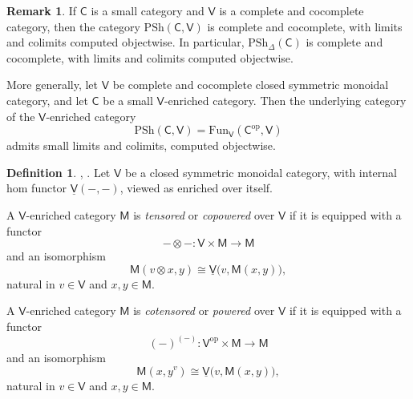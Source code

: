 \documentclass{amsart}
\newcommand{\cat}[1]{\mathsf{#1}}
\newcommand{\Fun}{\mathrm{Fun}}
\newcommand{\psh}{\mathrm{PSh}}
\newcommand{\spsh}{\mathrm{PSh}_{\Delta}}
\renewcommand{\op}{\mathrm{op}}
\theoremstyle{definition}
\newtheorem{definition}[equation]{Definition}
\newtheorem{remark}[equation]{Remark}
\numberwithin{equation}{subsection}
\numberwithin{subsubsection}{subsection}
\begin{document}
\begin{remark}\label{rem:presheaves.complete.cocomplete}
  If \( \cat{C} \) is a small category and \( \cat{V} \) is a complete and
  cocomplete category, then the category \( \psh(\cat{C},\cat{V}) \) is complete
  and cocomplete,
  with limits and colimits computed objectwise. In particular,
  \( \spsh(\cat{C}) \) is complete and cocomplete, with limits and colimits
  computed objectwise.

  More generally, let \( \cat{V} \) be complete and cocomplete closed
  symmetric monoidal category, and let \( \cat{C} \) be a small \( \cat{V}
  \)-enriched
  category. Then the underlying category of the $\cat{V}$-enriched category
  \[
    \psh(\cat{C},\cat{V})
    =
    \Fun_{\cat{V}}(\cat{C}^{\op},\cat{V})
  \]
  admits small limits and colimits, computed objectwise.
\end{remark}

\begin{definition}\label{def:tensored.cotensored}
  \textnormal{\cite[Section~3.7]{Kel82}},
  \textnormal{\cite[Definitions~3.7.2--3]{Rie14}}.
  Let \( \cat{V} \) be a closed symmetric monoidal category, with internal hom
  functor \( \underline{\cat{V}}(-,-) \), viewed as enriched over itself.

  A \( \cat{V} \)-enriched category \( \cat{M} \) is \emph{tensored}
  or \emph{copowered} over \( \cat{V} \) if it is equipped with a functor
  \[
    -\otimes- : \cat{V}\times \cat{M}\to \cat{M}
  \]
  and an isomorphism
  \[
    \cat{M}(v\otimes x,y)
    \cong
    \underline{\cat{V}}\bigl(v,\cat{M}(x,y)\bigr),
  \]
  natural in \( v\in\cat{V} \) and \( x,y\in\cat{M} \).

  A \( \cat{V} \)-enriched category \( \cat{M} \) is \emph{cotensored}
  or \emph{powered} over \( \cat{V} \) if it is equipped with a functor
  \[
    (-)^{(-)} : \cat{V}^{\op}\times \cat{M}\to \cat{M}
  \]
  and an isomorphism
  \[
    \cat{M}(x,y^{v})
    \cong
    \underline{\cat{V}}\bigl(v,\cat{M}(x,y)\bigr),
  \]
  natural in \( v\in\cat{V} \) and \( x,y\in\cat{M} \).
\end{definition}
\end{document}
